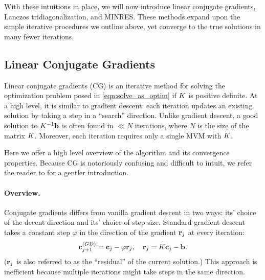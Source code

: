 With these intuitions in place, we will now introduce linear conjugate gradients, Lanczos tridiagonalization, and MINRES.
These methods expand upon the simple iterative procedures we outline above, yet converge to the true solutions in many fewer iterations.



\subsection{Linear Conjugate Gradients}
\label{sec:cg}

Linear conjugate gradients (CG) \cite{hestenes1952methods} is an iterative method for solving the optimization problem posed in \cref{eqn:solve_as_optim} if $K$ is positive definite.
At a high level, it is similar to gradient descent: each iteration updates an existing solution by taking a step in a ``search'' direction.
Unlike gradient descent, a good solution to $K^{-1} \mathbf{b}$ is often found in $\ll N$ iterations, where $N$ is the size of the matrix $K$.
Moreover, each iteration requires only a single MVM with $K$.

Here we offer a high level overview of the algorithm and its convergence properties.
Because CG is notoriously confusing and difficult to intuit, we refer the reader to \citet{shewchuk1994introduction} for a gentler introduction.

\paragraph{Overview.}
Conjugate gradients differs from vanilla gradient descent in two ways: its' choice of the decent direction and its' choice of step size.
Standard gradient descent takes a constant step $\varphi$ in the direction of the gradient $\mathbf{r}_j$ at every iteration:
%
\begin{equation*}
  \mathbf{c}_{j+1}^{\text(GD)} = \mathbf{c}_{j} - \varphi \mathbf{r}_{j}, \quad
  \mathbf{r}_{j} = K \mathbf{c}_{j} - \mathbf{b}.
\end{equation*}
%
($\mathbf{r}_j$ is also referred to as the ``residual'' of the current solution.)
This approach is inefficient because multiple iterations might take steps in the same direction.


